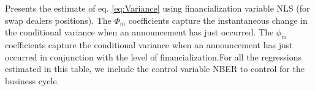 \begin{landscape}
\begin{table}[]
\begin{tablenotes}
        \singlespacing
        \footnotesize
       Presents the estimate of eq. \ref{eq:Variance} using financialization variable NLS (for swap dealers positions). The $\Phi_m$ coefficients capture the instantaneous change in the conditional variance when an announcement has just occurred. The $\phi_m$ coefficients capture the conditional variance when an announcement has just occurred in conjunction with the level of financialization.For all the regressions estimated in this table, we include the control variable NBER to control for the business cycle. 


    \end{tablenotes}
    
\end{table}
\end{landscape}








